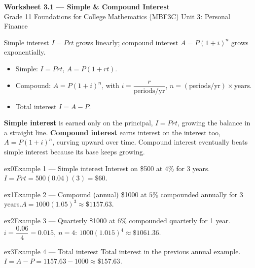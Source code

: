 \documentclass[11pt]{article}
\begin{document}
\begin{center}
{\LARGE\bfseries\color{titleblue}Worksheet 3.1 --- Simple \& Compound Interest}\\[2pt]
{\small Grade 11 Foundations for College Mathematics (MBF3C) \textperiodcentered{} Unit 3: Personal Finance}
\end{center}

\begin{ideabox}
Simple interest $I=Prt$ grows linearly; compound interest $A=P(1+i)^n$ grows exponentially.
\begin{itemize}[leftmargin=*,itemsep=2pt]
  \item Simple: $I=Prt$, $A=P(1+rt)$.
  \item Compound: $A=P(1+i)^n$, with $i=\dfrac{r}{\text{periods/yr}}$, $n=(\text{periods/yr})\times\text{years}$.
  \item Total interest $I=A-P$.
\end{itemize}
\end{ideabox}

\begin{learnbox}
\textbf{Simple interest} is earned only on the principal, $I=Prt$, growing the balance in a straight line.
\textbf{Compound interest} earns interest on the interest too, $A=P(1+i)^n$, curving upward over time.
Compound interest eventually beats simple interest because its base keeps growing.
\end{learnbox}


\begin{example}{ex0}{Example 1 --- Simple interest}
Interest on \$500 at $4\%$ for 3 years.\soln $I=Prt=500(0.04)(3)=\$60$.
\end{example}

\begin{example}{ex1}{Example 2 --- Compound (annual)}
\$1000 at $5\%$ compounded annually for 3 years.\soln $A=1000(1.05)^3\approx\$1157.63$.
\end{example}

\begin{example}{ex2}{Example 3 --- Quarterly}
\$1000 at $6\%$ compounded quarterly for 1 year.\soln $i=\dfrac{0.06}{4}=0.015,\ n=4$: $1000(1.015)^4\approx\$1061.36$.
\end{example}

\begin{example}{ex3}{Example 4 --- Total interest}
Total interest in the previous annual example.\soln $I=A-P=1157.63-1000\approx\$157.63$.
\end{example}
\end{document}

